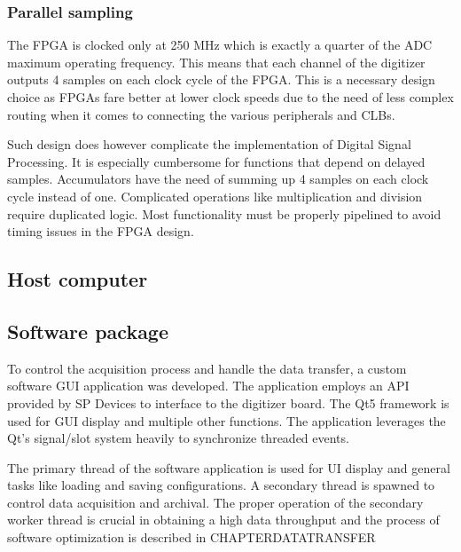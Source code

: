 \subsubsection{Parallel sampling}

The FPGA is clocked only at 250 MHz which is exactly a quarter of 
the ADC maximum operating frequency. This means that each channel
of the digitizer outputs 4 samples on each clock cycle of the 
FPGA. This is a necessary design choice as FPGAs fare better 
at lower clock speeds due to the need of less complex routing
when it comes to connecting the various peripherals and CLBs.


Such design does however complicate the implementation of 
Digital Signal Processing. It is especially cumbersome for 
functions that depend on delayed samples.
Accumulators have the need of summing up 4 samples on
each clock cycle instead of one. Complicated operations
like multiplication and division require duplicated logic.
Most functionality must be properly pipelined to avoid
timing issues in the FPGA design.

\subsection{Host computer}
\subsection{Software package}
To control the acquisition process and handle the data transfer,
a custom software GUI application was developed. The application
employs an API provided by SP Devices to interface to the digitizer board.
The Qt5 framework is used for GUI display and multiple other functions.
The application leverages the Qt's signal/slot system heavily to synchronize
threaded events.


The primary thread of the software application
is used for UI display and general tasks like 
loading and saving configurations. A secondary thread
is spawned to control data acquisition and archival.
The proper operation of the secondary worker thread
is crucial in obtaining a high data throughput and 
the process of software optimization is described in 
CHAPTERDATATRANSFER

